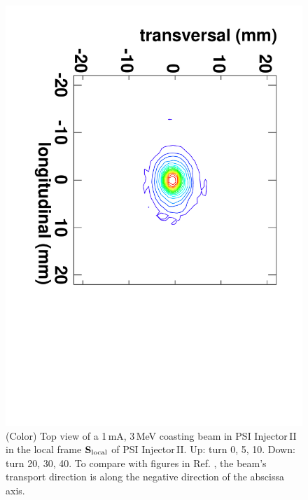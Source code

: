 \documentclass[aps,prstab,onecolumn,superscriptaddress,showpacs]{revtex4}
\newcommand{\bs}[1]{\mathbf #1}
\begin{document}
\begin{figure}
    \includegraphics[angle=90,width=0.3\linewidth]{figures/Inj2/1mA40.pdf}
    \caption{(Color) Top view of a 1\,mA, 3\,MeV coasting beam in PSI Injector\,II in the local frame ${\bs{S}_{\RM{local}}}$ of PSI Injector\,II. 
      Up: turn 0, 5, 10. Down: turn 20, 30, 40. To compare with figures in Ref. , 
      the beam's transport direction is along the negative direction of the abscissa axis.}
    \label{fig:coasting1mAA}
\end{figure}




\end{document}
